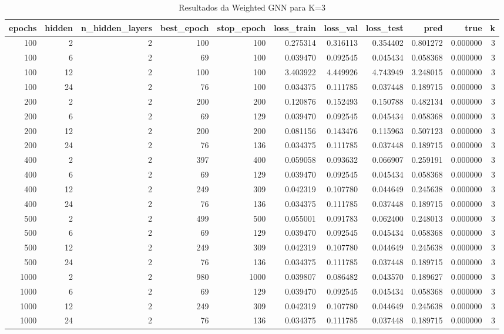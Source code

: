 \begin{table}
\caption{Resultados da Weighted GNN para K=3}
\label{tab:weighted_gnn_results_k3}
\begin{tabular}{rrrrrrrrrrr}
\toprule
epochs & hidden & n\_hidden\_layers & best\_epoch & stop\_epoch & loss\_train & loss\_val & loss\_test & pred & true & k \\
\midrule
100 & 2 & 2 & 100 & 100 & 0.275314 & 0.316113 & 0.354402 & 0.801272 & 0.000000 & 3 \\
100 & 6 & 2 & 69 & 100 & 0.039470 & 0.092545 & 0.045434 & 0.058368 & 0.000000 & 3 \\
100 & 12 & 2 & 100 & 100 & 3.403922 & 4.449926 & 4.743949 & 3.248015 & 0.000000 & 3 \\
100 & 24 & 2 & 76 & 100 & 0.034375 & 0.111785 & 0.037448 & 0.189715 & 0.000000 & 3 \\
200 & 2 & 2 & 200 & 200 & 0.120876 & 0.152493 & 0.150788 & 0.482134 & 0.000000 & 3 \\
200 & 6 & 2 & 69 & 129 & 0.039470 & 0.092545 & 0.045434 & 0.058368 & 0.000000 & 3 \\
200 & 12 & 2 & 200 & 200 & 0.081156 & 0.143476 & 0.115963 & 0.507123 & 0.000000 & 3 \\
200 & 24 & 2 & 76 & 136 & 0.034375 & 0.111785 & 0.037448 & 0.189715 & 0.000000 & 3 \\
400 & 2 & 2 & 397 & 400 & 0.059058 & 0.093632 & 0.066907 & 0.259191 & 0.000000 & 3 \\
400 & 6 & 2 & 69 & 129 & 0.039470 & 0.092545 & 0.045434 & 0.058368 & 0.000000 & 3 \\
400 & 12 & 2 & 249 & 309 & 0.042319 & 0.107780 & 0.044649 & 0.245638 & 0.000000 & 3 \\
400 & 24 & 2 & 76 & 136 & 0.034375 & 0.111785 & 0.037448 & 0.189715 & 0.000000 & 3 \\
500 & 2 & 2 & 499 & 500 & 0.055001 & 0.091783 & 0.062400 & 0.248013 & 0.000000 & 3 \\
500 & 6 & 2 & 69 & 129 & 0.039470 & 0.092545 & 0.045434 & 0.058368 & 0.000000 & 3 \\
500 & 12 & 2 & 249 & 309 & 0.042319 & 0.107780 & 0.044649 & 0.245638 & 0.000000 & 3 \\
500 & 24 & 2 & 76 & 136 & 0.034375 & 0.111785 & 0.037448 & 0.189715 & 0.000000 & 3 \\
1000 & 2 & 2 & 980 & 1000 & 0.039807 & 0.086482 & 0.043570 & 0.189627 & 0.000000 & 3 \\
1000 & 6 & 2 & 69 & 129 & 0.039470 & 0.092545 & 0.045434 & 0.058368 & 0.000000 & 3 \\
1000 & 12 & 2 & 249 & 309 & 0.042319 & 0.107780 & 0.044649 & 0.245638 & 0.000000 & 3 \\
1000 & 24 & 2 & 76 & 136 & 0.034375 & 0.111785 & 0.037448 & 0.189715 & 0.000000 & 3 \\
\bottomrule
\end{tabular}
\end{table}

